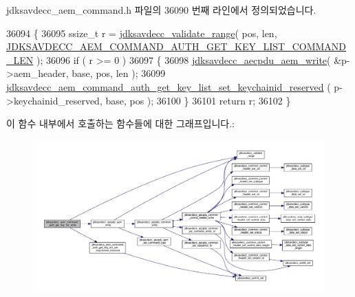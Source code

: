 jdksavdecc\+\_\+aem\+\_\+command.\+h 파일의 36090 번째 라인에서 정의되었습니다.


\begin{DoxyCode}
36094 \{
36095     ssize\_t r = \hyperlink{group__util_ga9c02bdfe76c69163647c3196db7a73a1}{jdksavdecc\_validate\_range}( pos, len, 
      \hyperlink{group__command__auth__get__key__list_ga9a51067861389e660c4de9e2ac82a0e2}{JDKSAVDECC\_AEM\_COMMAND\_AUTH\_GET\_KEY\_LIST\_COMMAND\_LEN} );
36096     \textcolor{keywordflow}{if} ( r >= 0 )
36097     \{
36098         \hyperlink{group__aecpdu__aem_gad658e55771cce77cecf7aae91e1dcbc5}{jdksavdecc\_aecpdu\_aem\_write}( &p->aem\_header, base, pos, len );
36099         \hyperlink{group__command__auth__get__key__list_gafca9e82b4812da3ea42a9409302af31a}{jdksavdecc\_aem\_command\_auth\_get\_key\_list\_set\_keychainid\_reserved}
      ( p->keychainid\_reserved, base, pos );
36100     \}
36101     \textcolor{keywordflow}{return} r;
36102 \}
\end{DoxyCode}


이 함수 내부에서 호출하는 함수들에 대한 그래프입니다.\+:
\nopagebreak
\begin{figure}[H]
\begin{center}
\leavevmode
\includegraphics[width=350pt]{group__command__auth__get__key__list_ga7aa47912d1c708741ffb7e6099792f46_cgraph}
\end{center}
\end{figure}


